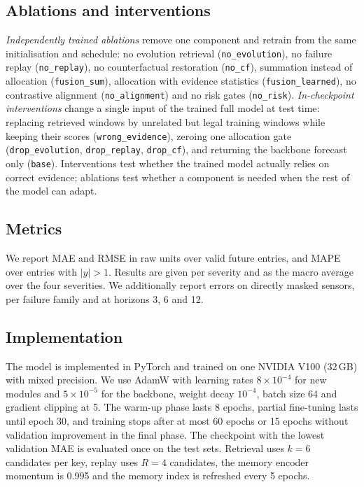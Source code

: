 \subsection{Ablations and interventions}
\emph{Independently trained ablations} remove one component and retrain from the same initialisation and schedule: no evolution retrieval (\texttt{no\_evolution}), no failure replay (\texttt{no\_replay}), no counterfactual restoration (\texttt{no\_cf}), summation instead of allocation (\texttt{fusion\_sum}), allocation with evidence statistics (\texttt{fusion\_learned}), no contrastive alignment (\texttt{no\_alignment}) and no risk gates (\texttt{no\_risk}).
\emph{In-checkpoint interventions} change a single input of the trained full model at test time: replacing retrieved windows by unrelated but legal training windows while keeping their scores (\texttt{wrong\_evidence}), zeroing one allocation gate (\texttt{drop\_evolution}, \texttt{drop\_replay}, \texttt{drop\_cf}), and returning the backbone forecast only (\texttt{base}). Interventions test whether the trained model actually relies on correct evidence; ablations test whether a component is needed when the rest of the model can adapt.

\subsection{Metrics}
We report MAE and RMSE in raw units over valid future entries, and MAPE over entries with $|y|>1$. Results are given per severity and as the macro average over the four severities. We additionally report errors on directly masked sensors, per failure family and at horizons 3, 6 and 12. 

\subsection{Implementation}
The model is implemented in PyTorch and trained on one NVIDIA V100 (32\,GB) with mixed precision. We use AdamW with learning rates $8\times10^{-4}$ for new modules and $5\times10^{-5}$ for the backbone, weight decay $10^{-4}$, batch size 64 and gradient clipping at 5. The warm-up phase lasts 8 epochs, partial fine-tuning lasts until epoch 30, and training stops after at most 60 epochs or 15 epochs without validation improvement in the final phase. The checkpoint with the lowest validation MAE is evaluated once on the test sets. Retrieval uses $k=6$ candidates per key, replay uses $R=4$ candidates, the memory encoder momentum is 0.995 and the memory index is refreshed every 5 epochs. 
